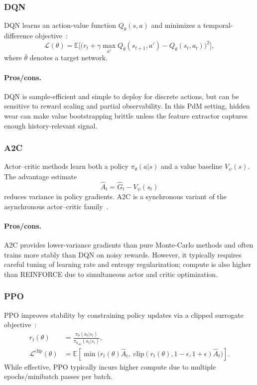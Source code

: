 \documentclass[11pt]{article}
\begin{document}
\subsubsection{\textsc{DQN}}
\textsc{DQN} learns an action-value function $Q_\theta(s,a)$ and minimizes a temporal-difference objective~\cite{Mnih2015DQN}:
\begin{equation}
  \mathcal{L}(\theta) = \mathbb{E}\bigl[\bigl(r_t + \gamma \max_{a'}Q_{\bar\theta}(s_{t+1},a') - Q_\theta(s_t,a_t)\bigr)^2\bigr],
\end{equation}
where $\bar\theta$ denotes a target network.

\paragraph{Pros/cons.}
DQN is sample-efficient and simple to deploy for discrete actions, but can be sensitive to reward scaling and partial observability. In this PdM setting, hidden wear can make value bootstrapping brittle unless the feature extractor captures enough history-relevant signal.

\subsubsection{\textsc{A2C}}
Actor--critic methods learn both a policy $\pi_\theta(a|s)$ and a value baseline $V_\psi(s)$. The advantage estimate
\begin{equation}
  \hat{A}_t = \hat{G}_t - V_\psi(s_t)
\end{equation}
reduces variance in policy gradients. \textsc{A2C} is a synchronous variant of the asynchronous actor--critic family~\cite{Mnih2016A3C}.

\paragraph{Pros/cons.}
A2C provides lower-variance gradients than pure Monte-Carlo methods and often trains more stably than DQN on noisy rewards. However, it typically requires careful tuning of learning rate and entropy regularization; compute is also higher than REINFORCE due to simultaneous actor and critic optimization.

\subsubsection{\textsc{PPO}}
\textsc{PPO} improves stability by constraining policy updates via a clipped surrogate objective~\cite{Schulman2017PPO}:
\begin{align}
  r_t(\theta) &= \frac{\pi_\theta(a_t|s_t)}{\pi_{\theta_{\text{old}}}(a_t|s_t)},\\
  \mathcal{L}^{\text{clip}}(\theta) &= \mathbb{E}\left[\min\Big(r_t(\theta)\hat{A}_t,\; \mathrm{clip}(r_t(\theta),1{-}\epsilon,1{+}\epsilon)\hat{A}_t\Big)\right].
\end{align}
While effective, PPO typically incurs higher compute due to multiple epochs/minibatch passes per batch.
\end{document}
